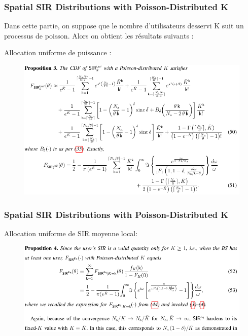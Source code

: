 \documentclass[pdf]{beamer}
\begin{document}
\begin{frame}[label=spatialsirk]
\frametitle{Spatial SIR Distributions with Poisson-Distributed K}
Dans cette partie, on suppose que le nombre d'utilisateurs desservi K suit un processus de poisson. Alors on obtient les résultats suivants : 
\begin{exampleblock}{Allocation uniforme de puissance :}
\justify
\begin{figure}
	\includegraphics[width=0.8\linewidth]{3}
\end{figure}
\end{exampleblock}
\end{frame}

\begin{frame}
\frametitle{Spatial SIR Distributions with Poisson-Distributed K}
\begin{exampleblock}{Allocation uniforme de SIR moyenne local:}
\justify
\begin{figure}
	\includegraphics[width=1\linewidth]{4}
\end{figure}
\end{exampleblock}
\end{frame}
\end{document}
